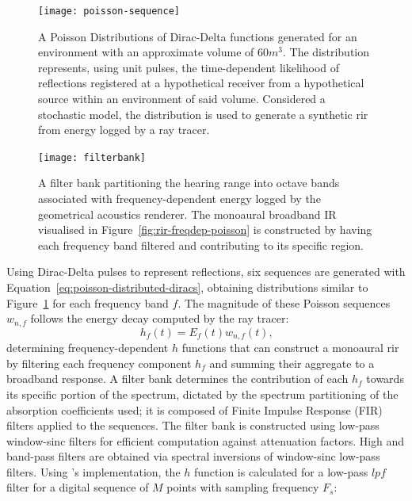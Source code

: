\begin{figure}[htbp]
    \centering
    \texttt{[image: poisson-sequence]}
    \caption[Generation of Poisson-distributed Dirac-Delta pulses]{A Poisson Distributions of Dirac-Delta functions generated for an environment with an approximate volume of $60m^3$. The distribution represents, using unit pulses, the time-dependent likelihood of reflections registered at a hypothetical receiver from a hypothetical source within an environment of said volume. Considered a stochastic model, the distribution is used to generate a synthetic \acrshort{rir} from energy logged by a ray tracer.}\label{fig:poisson-sequence}
\end{figure}

\begin{figure}[htbp]
    \centering
    \texttt{[image: filterbank]}
    \caption[Visualisation of filter bank for frequency-dependent Impulse Response processing]{A filter bank partitioning the hearing range into octave bands associated with frequency-dependent energy logged by the geometrical acoustics renderer. The monoaural broadband IR visualised in Figure~\ref{fig:rir-freqdep-poisson} is constructed by having each frequency band filtered and contributing to its specific region. }
    \label{fig:filterbank}
\end{figure}
Using Dirac-Delta pulses to represent reflections, six sequences are generated with Equation~\ref{eq:poisson-distributed-diracs}, obtaining distributions similar to Figure~\ref{fig:poisson-sequence} for each frequency band $f$. The magnitude of these Poisson sequences $w_{n,f}$ follows the energy decay computed by the ray tracer: 
\begin{equation}
    h_f(t) = E_f(t)w_{n,f}(t)\textrm{,}
\end{equation}
determining frequency-dependent $h$ functions that can construct a monoaural \acrshort{rir} by filtering each frequency component $h_f$ and summing their aggregate to a broadband response. A filter bank determines the contribution of each $h_f$ towards its specific portion of the spectrum, dictated by the spectrum partitioning of the absorption coefficients used; it is composed of Finite Impulse Response (FIR) filters applied to the sequences. The filter bank is constructed using low-pass window-sinc filters for efficient computation against attenuation factors. High and band-pass filters are obtained via spectral inversions of window-sinc low-pass filters. Using \cite{smith1997scientist}'s implementation, the $h$ function is calculated for a low-pass $lpf$ filter for a digital sequence of $M$ points with sampling frequency $F_s$:
